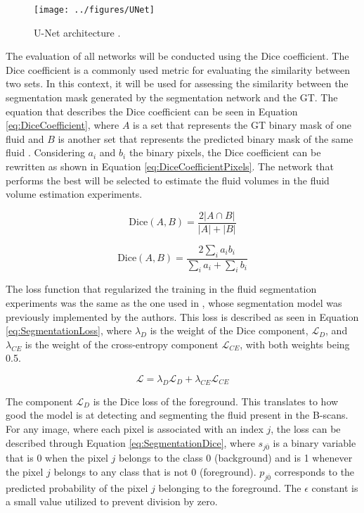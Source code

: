 \begin{figure}[!ht]
	\centering
	\texttt{[image: ../figures/UNet]}
	\caption{U-Net architecture \cite{Ronneberger2015}.}
	\label{fig:UNet}
\end{figure}

The evaluation of all networks will be conducted using the Dice coefficient. The Dice coefficient is a commonly used metric for evaluating the similarity between two sets. In this context, it will be used for assessing the similarity between the segmentation mask generated by the segmentation network and the GT. The equation that describes the Dice coefficient can be seen in Equation \ref{eq:DiceCoefficient}, where $A$ is a set that represents the GT binary mask of one fluid and $B$ is another set that represents the predicted binary mask of the same fluid \cite{Shamir2019}. Considering $a_{i}$ and $b_{i}$ the binary pixels, the Dice coefficient can be rewritten as shown in Equation \ref{eq:DiceCoefficientPixels}. The network that performs the best will be selected to estimate the fluid volumes in the fluid volume estimation experiments.

\begin{equation}
	\text{Dice}(A, B) = \frac{2|A \cap B|}{|A| + |B|}
	\label{eq:DiceCoefficient}
\end{equation}

\begin{equation}
	\text{Dice}(A, B) = \frac{2\sum_{i} a_{i} b_{i}}{\sum_{i} a_{i} + \sum_{i} b_{i}}
	\label{eq:DiceCoefficientPixels}
\end{equation}

The loss function that regularized the training in the fluid segmentation experiments was the same as the one used in \textcite{Tennakoon2018}, whose segmentation model was previously implemented by the authors. This loss is described as seen in Equation \ref{eq:SegmentationLoss}, where $\lambda_{D}$ is the weight of the Dice component, $\mathcal{L}_{D}$, and $\lambda_{CE}$ is the weight of the cross-entropy component $\mathcal{L}_{CE}$, with both weights being 0.5.

\begin{equation}
	\mathcal{L} = \lambda_{D} \mathcal{L}_{D} + \lambda_{CE} \mathcal{L}_{CE}
	\label{eq:SegmentationLoss}
\end{equation}

The component $\mathcal{L}_{D}$ is the Dice loss of the foreground. This translates to how good the model is at detecting and segmenting the fluid present in the B-scans. For any image, where each pixel is associated with an index $j$, the loss can be described through Equation \ref{eq:SegmentationDice}, where $s_{j\overline{0}}$ is a binary variable that is 0 when the pixel $j$ belongs to the class 0 (background) and is 1 whenever the pixel $j$ belongs to any class that is not 0 (foreground). $p_{j\overline{0}}$ corresponds to the predicted probability of the pixel $j$ belonging to the foreground. The $\epsilon$ constant is a small value utilized to prevent division by zero.

